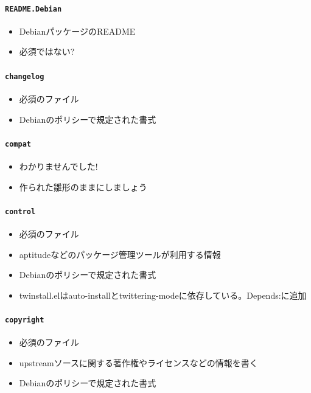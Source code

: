 \documentclass[mingoth,a4paper]{jsarticle}
\begin{document}
\paragraph{\texttt{README.Debian}}
  \begin{itemize}
    \item DebianパッケージのREADME
    \item 必須ではない?
  \end{itemize}

\paragraph{\texttt{changelog}}
  \begin{itemize}
    \item 必須のファイル
    \item Debianのポリシーで規定された書式
  \end{itemize}

\paragraph{\texttt{compat}}
  \begin{itemize}
    \item わかりませんでした!
    \item 作られた雛形のままにしましょう
  \end{itemize}

\paragraph{\texttt{control}}
  \begin{itemize}
    \item 必須のファイル
    \item aptitudeなどのパッケージ管理ツールが利用する情報
    \item Debianのポリシーで規定された書式
    \item twinstall.elはauto-installとtwittering-modeに依存している。Depends:に追加
  \end{itemize}

\paragraph{\texttt{copyright}}
  \begin{itemize}
    \item 必須のファイル
    \item upstreamソースに関する著作権やライセンスなどの情報を書く
    \item Debianのポリシーで規定された書式
  \end{itemize}
\end{document}
